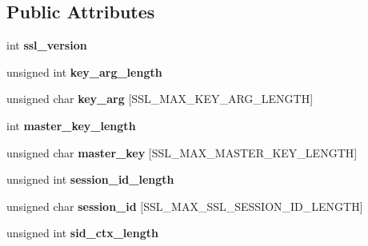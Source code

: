 \subsection*{Public Attributes}
\begin{DoxyCompactItemize}
\item 
\mbox{\label{structssl__session__st_a551e39a73ea78af29979d80d8a6db6f9}} 
int {\bfseries ssl\+\_\+version}
\item 
\mbox{\label{structssl__session__st_aa59c33cbe59e8aa9fd097d2034665935}} 
unsigned int {\bfseries key\+\_\+arg\+\_\+length}
\item 
\mbox{\label{structssl__session__st_a5f697ed1d136a066dcaa054a5aca54d5}} 
unsigned char {\bfseries key\+\_\+arg} \mbox{[}S\+S\+L\+\_\+\+M\+A\+X\+\_\+\+K\+E\+Y\+\_\+\+A\+R\+G\+\_\+\+L\+E\+N\+G\+TH\mbox{]}
\item 
\mbox{\label{structssl__session__st_a368c71211d55bcd3528a752c15e14e5d}} 
int {\bfseries master\+\_\+key\+\_\+length}
\item 
\mbox{\label{structssl__session__st_ae0d5ecf4472dbff80b1ed36ce9c051c3}} 
unsigned char {\bfseries master\+\_\+key} \mbox{[}S\+S\+L\+\_\+\+M\+A\+X\+\_\+\+M\+A\+S\+T\+E\+R\+\_\+\+K\+E\+Y\+\_\+\+L\+E\+N\+G\+TH\mbox{]}
\item 
\mbox{\label{structssl__session__st_a593371acd210b99ad600853361b807ce}} 
unsigned int {\bfseries session\+\_\+id\+\_\+length}
\item 
\mbox{\label{structssl__session__st_a3e03d6073d29316d9eaecb78938ec92f}} 
unsigned char {\bfseries session\+\_\+id} \mbox{[}S\+S\+L\+\_\+\+M\+A\+X\+\_\+\+S\+S\+L\+\_\+\+S\+E\+S\+S\+I\+O\+N\+\_\+\+I\+D\+\_\+\+L\+E\+N\+G\+TH\mbox{]}
\item 
\mbox{\label{structssl__session__st_a22ec3aac135c2b8268e0ea69c66fc829}} 
unsigned int {\bfseries sid\+\_\+ctx\+\_\+length}
\item 
\mbox{\label{structssl__session__st_ad465f7554a5e14d6c92ee563d5ed6fe1}} 

\end{DoxyCompactItemize}
